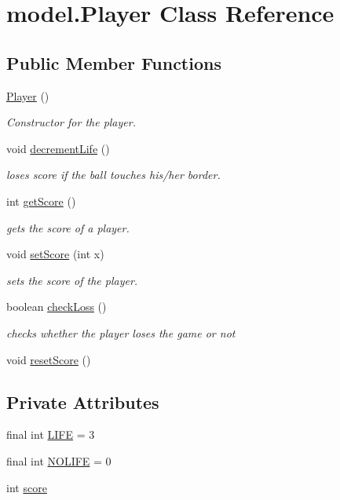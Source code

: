 \hypertarget{classmodel_1_1_player}{}\section{model.\+Player Class Reference}
\label{classmodel_1_1_player}
\subsection*{Public Member Functions}
\begin{DoxyCompactItemize}
\item 
\hyperlink{classmodel_1_1_player_a6922d8b0b084510c84540a3497504ed3}{Player} ()
\begin{DoxyCompactList}\small\item\em Constructor for the player. \end{DoxyCompactList}\item 
void \hyperlink{classmodel_1_1_player_a5551dad23bcab60638b37c8f54dd6796}{decrement\+Life} ()
\begin{DoxyCompactList}\small\item\em loses score if the ball touches his/her border. \end{DoxyCompactList}\item 
int \hyperlink{classmodel_1_1_player_a9e027a7ee08d451cde3e6743e2ef1d6d}{get\+Score} ()
\begin{DoxyCompactList}\small\item\em gets the score of a player. \end{DoxyCompactList}\item 
void \hyperlink{classmodel_1_1_player_acb5f4cdd639aa3e68a5003ec81bdd47c}{set\+Score} (int x)
\begin{DoxyCompactList}\small\item\em sets the score of the player. \end{DoxyCompactList}\item 
boolean \hyperlink{classmodel_1_1_player_a1027595469ab5de940ba2f6cbb29e5ef}{check\+Loss} ()
\begin{DoxyCompactList}\small\item\em checks whether the player loses the game or not \end{DoxyCompactList}\item 
void \hyperlink{classmodel_1_1_player_a1ce780b4bc3a1564934975b18e68df8c}{reset\+Score} ()
\end{DoxyCompactItemize}
\subsection*{Private Attributes}
\begin{DoxyCompactItemize}
\item 
final int \hyperlink{classmodel_1_1_player_a59153913ee338710aa1a33b68e5d0dbd}{L\+I\+FE} = 3
\item 
final int \hyperlink{classmodel_1_1_player_ad422bd3896f6c86c74fe49be0cae6759}{N\+O\+L\+I\+FE} = 0
\item 
int \hyperlink{classmodel_1_1_player_ad6d852aea99befddd30bb094222123d2}{score}
\end{DoxyCompactItemize}


